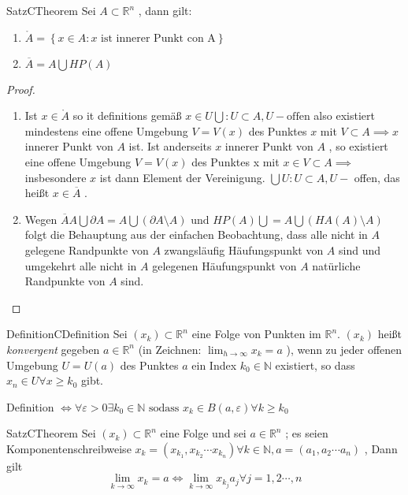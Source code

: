 \documentclass[11.5 pt, a4paper]{memoir}
\begin{document}
\begin{ibox}[8]{Satz}{CTheorem}
    Sei $ A \subset \mathbb{R}^n $ , dann gilt:
	\begin{enumerate}[label=\alph*)]
		\item $ \mathring{A} = \left\{ x \in A : x \text{ ist innerer Punkt con A} \right\}  $ 
		\item $ \overline{A} = A \bigcup HP(A) $ 
 	\end{enumerate}
\end{ibox}
\begin{proof}
	\begin{enumerate}[label=\alph*)]
		\item Ist $ x \in \mathring{A} $ so it definitions gemäß $ x \in U \bigcup : U \subset A, U-\text{offen} $ 
			also existiert mindestens eine offene Umgebung $ V = V(x) $ des Punktes $ x  $ mit $ V \subset A \implies x $ innerer Punkt
			von $ A $ ist. Ist anderseits $ x $ innerer Punkt von $ A $ , so existiert eine offene Umgebung $ V = V(x) $ des 
			Punktes x mit $ x \in V \subset A \implies $ insbesondere $ x  $ ist dann Element der Vereinigung. 
			$ \bigcup U : U \subset A, U- $ offen, das heißt $ x \in \overline{A} $ .
		\item Wegen $ \overline{A} A \bigcup \partial A = A \bigcup \left( \partial A \setminus A \right) \text{ und } HP(A) \bigcup 
			= A \bigcup (HA(A)\setminus A) $  folgt die Behauptung aus der einfachen Beobachtung, dass alle nicht in $ A $ gelegene
			Randpunkte von $ A $ zwangsläufig Häufungspunkt von $ A $ sind und umgekehrt alle nicht in $ A $ gelegenen Häufungspunkt 
			von $ A $ natürliche Randpunkte von $ A $ sind. 
	\end{enumerate}
	 
\end{proof}
\begin{ibox}{Definition}{CDefinition}
    Sei $ \left( x_k \right) \subset \mathbb{R}^n $ eine Folge von Punkten im $ \mathbb{R}^n $. $ (x_k) $ heißt \textit{konvergent}
	gegeben $ a \in \mathbb{R}^n $ (in Zeichnen: $ \lim_{h \to \infty} x_k = a$ ), wenn zu jeder offenen Umgebung $ U = U(a) $ des 
	Punktes $ a $ ein Index $ k_0 \in \mathbb{N}$ existiert, so dass $ x_n \in U \forall x \geq k_0$ gibt. 
\end{ibox}
Definition $ \iff \forall \varepsilon > 0 \exists k_0 \in \mathbb{N} \text{ sodass } x_k \in B(a, \varepsilon)	\forall k \geq k_0 $ 
\begin{ibox}[9]{Satz}{CTheorem}
    Sei $ \left( x_k \right) \subset \mathbb{R}^n $ eine Folge und sei $ a \in \mathbb{R}^n $ ; es seien Komponentenschreibweise 
$ x_k = \left( x_{k_1}, x_{k_2} \cdots x_{k_n} \right) \forall k \in \mathbb{N}, a = (a_1,a_2 \cdots a_{n})  $ , Dann gilt 
$$ \lim_{k \to \infty} x_{k} = a \iff \lim_{k \to \infty}x_{k_{j}} a_{j} \forall j = 1,2 \cdots, n$$
\end{ibox}
\end{document}
